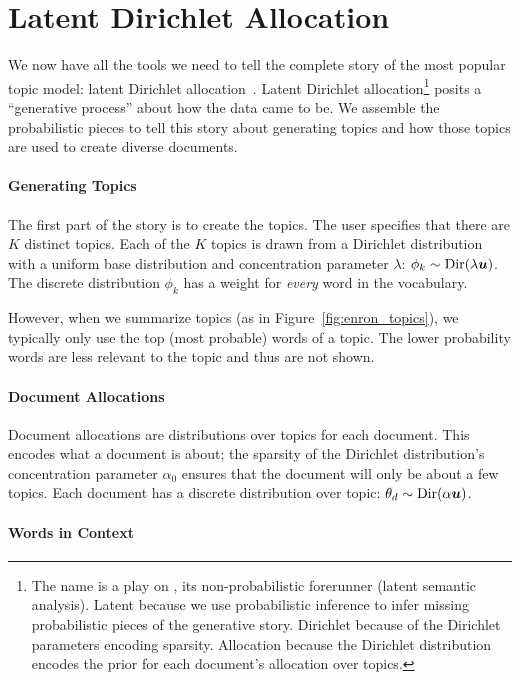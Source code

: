 \section{Latent Dirichlet Allocation}
\label{sec:lda}

We now have all the tools we need to tell the complete story of the most popular topic model: latent Dirichlet allocation~\citep{blei-03}.  Latent
Dirichlet allocation\footnote{The name  is a play on , its
  non-probabilistic forerunner (latent semantic analysis).  Latent because we
  use probabilistic inference to infer missing probabilistic pieces of the
  generative story.  Dirichlet because of the Dirichlet parameters encoding
  sparsity.  Allocation because the Dirichlet distribution encodes the prior for
  each document's allocation over topics.} posits a ``generative process'' about
how the data came to be.  We assemble the probabilistic pieces to tell
this story about generating topics and how those topics are used to create
diverse documents.

\paragraph{Generating Topics}

The first part of the story is to create the topics.  The user specifies that
there are $K$ distinct topics.  Each of the $K$ topics is drawn from a Dirichlet
distribution with a uniform base distribution and concentration parameter
$\lambda$: $\phi_k \sim \mbox{Dir}(\lambda {\bm u})$.  The discrete distribution
$\phi_k$ has a weight for \emph{every} word in the vocabulary.

However, when we summarize topics (as in
Figure~\ref{fig:enron_topics}), we typically only use the top (most probable) words of
a topic.  The lower probability words are less relevant to the topic
and thus are not shown.

\paragraph{Document Allocations}

Document allocations are distributions over topics for each document.  This
encodes what a document is about; the sparsity of the Dirichlet distribution's
concentration parameter $\alpha_0$ ensures that the document will only be about a
few topics.  Each document has a discrete distribution over topic: $\theta_d \sim
\mbox{Dir}(\alpha {\bm u})$.

\paragraph{Words in Context}

